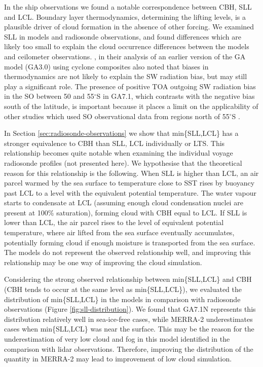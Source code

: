 In the ship observations we found a notable correspondence between CBH, SLL and
LCL. Boundary layer thermodynamics, determining the lifting levels, is a
plausible driver of cloud formation in the absence of other forcing. We
examined SLL in models and radiosonde observations, and found differences which
are likely too small to explain the cloud occurrence differences between the
models and ceilometer observations. \cite{bodas-salcedo2012}, in their analysis
of an earlier version of the GA model (GA3.0) using cyclone composites also
noted that biases in thermodynamics are not likely to explain the SW radiation
bias, but may still play a significant role. The presence of positive TOA
outgoing SW radiation bias in the SO between 50 and 55$^\circ$S in GA7.1, which
contrasts with the negative bias south of the latitude, is important because it
places a limit on the applicability of other studies which used SO
observational data from regions north of 55$^\circ$S \citep{lang2018}.

In Section \ref{sec:radiosonde-observations} we show that min\{SLL,LCL\} has a
stronger equivalence to CBH than SLL, LCL individually or LTS.  This
relationship becomes quite notable when examining the individual voyage
radiosonde profiles (not presented here). We hypothesise that the theoretical
reason for this relationship is the following. When SLL is higher than LCL, an
air parcel warmed by the sea surface to temperature close to SST rises by
buoyancy past LCL to a level with the equivalent potential temperature.  The
water vapour starts to condensate at LCL (assuming enough cloud condensation
nuclei are present at 100\% saturation), forming cloud with CBH equal to LCL.
If SLL is lower than LCL, the air parcel rises to the level of equivalent
potential temperature, where air lifted from the sea surface eventually
accumulates, potentially forming cloud if enough moisture is transported from
the sea surface. The models do not represent the observed relationship well,
and improving this relationship may be one way of improving the cloud
simulation.

Considering the strong observed relationship between min\{SLL,LCL\} and CBH
(CBH tends to occur at the same level as min\{SLL,LCL\}), we evaluated the
distribution of min\{SLL,LCL\} in the models in comparison with radiosonde
observations (Figure \ref{fig:sll-distribution}). We found that GA7.1N
represents this distribution relatively well in sea-ice-free cases, while
MERRA-2 underestimates cases when min\{SLL,LCL\} was near the surface. This may
be the reason for the underestimation of very low cloud and fog in this model
identified in the comparison with lidar observations. Therefore, improving the
distribution of the quantity in MERRA-2 may lead to improvement of low cloud
simulation.

